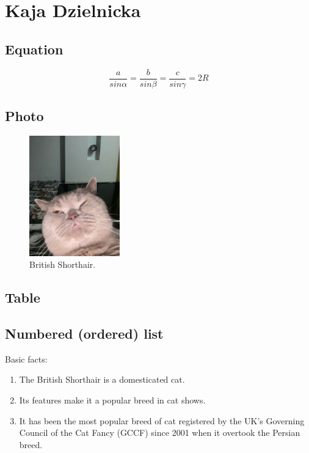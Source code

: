 
\newpage
\section{Kaja Dzielnicka}
\label{sec:kajadzielnicka}
\subsection{Equation}
    $$ \frac{a}{sin\alpha}=\frac{b}{sin\beta}=\frac{c}{sin\gamma}=2R$$

\subsection{Photo}
    \begin{figure}[h]
        \centering
        \includegraphics[width=0.35\textwidth]{./Pictures/kitty}
        \caption{British Shorthair.}
        \label{fig:cat}
    \end{figure}
    
\subsection{Table}
    
    
\subsection{Numbered (ordered) list}
    Basic facts:
    \begin{enumerate}
        \item The British Shorthair is a domesticated cat.
        \item Its features make it a popular breed in cat shows.
        \item It has been the most popular breed of cat registered by the UK's Governing Council of the Cat Fancy (GCCF) since 2001 when it overtook the Persian breed.
    \end{enumerate}
    
